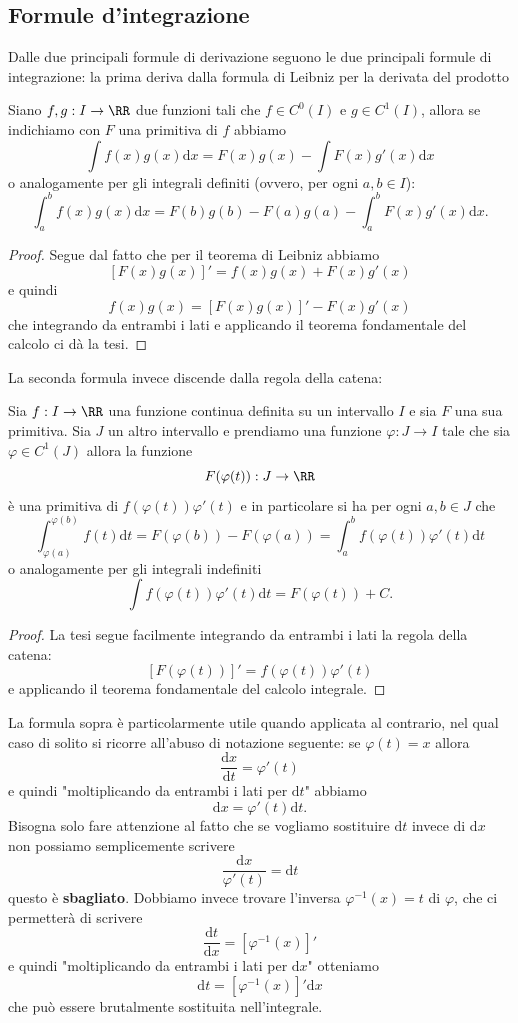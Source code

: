 \documentclass[11pt]{scrartcl}
\newcommand{\dif}{\text{d}}
\begin{document}
	\subsection{Formule d'integrazione}
	Dalle due principali formule di derivazione seguono le due principali formule di integrazione: la prima deriva dalla formula di Leibniz per la derivata del prodotto
	\begin{theorem}
		Siano $f,g:I\to\RR$ due funzioni tali che $f\in C^0(I)$ e $g\in C^1(I)$, allora se indichiamo con $F$ una primitiva di $f$ abbiamo
		$$\int f(x)g(x)\dif x=F(x)g(x)-\int F(x)g'(x)\dif x$$
		o analogamente per gli integrali definiti (ovvero, per ogni $a,b\in I$):
		$$\int_a^b f(x)g(x)\dif x=F(b)g(b)-F(a)g(a)-\int_a^b F(x)g'(x)\dif x.$$
	\end{theorem}
	\begin{proof}
		Segue dal fatto che per il teorema di Leibniz abbiamo
		$$\left[F(x)g(x)\right]'=f(x)g(x)+F(x)g'(x)$$
		e quindi
		$$f(x)g(x)=\left[F(x)g(x)\right]'-F(x)g'(x)$$
		che integrando da entrambi i lati e applicando il teorema fondamentale del calcolo ci dà la tesi.
	\end{proof}
	La seconda formula invece discende dalla regola della catena:
	\begin{theorem}
		Sia $f:I\to\RR$ una funzione continua definita su un intervallo $I$ e sia $F$ una sua primitiva. Sia $J$ un altro intervallo e prendiamo una funzione
		$\varphi:J\to I$ tale che sia $\varphi\in C^1(J)$ allora la funzione 
		$$F(\varphi(t)):J\to \RR$$
		è una primitiva di $f(\varphi(t))\varphi'(t)$ e in particolare si ha per ogni $a,b\in J$ che
		$$\int_{\varphi(a)}^{\varphi(b)}f(t)\dif t=F(\varphi(b))-F(\varphi(a))=\int_a^b f(\varphi(t))\varphi'(t)\dif t$$
		o analogamente per gli integrali indefiniti
		$$\int f(\varphi(t))\varphi'(t)\dif t=F(\varphi(t))+C.$$
	\end{theorem}
	\begin{proof}
		La tesi segue facilmente integrando da entrambi i lati la regola della catena:
		$$\left[F(\varphi(t))\right]'=f(\varphi(t))\varphi'(t)$$
		e applicando il teorema fondamentale del calcolo integrale.
	\end{proof}
	La formula sopra è particolarmente utile quando applicata al contrario, nel qual caso di solito si ricorre all'abuso di notazione seguente: se $\varphi(t)=x$ allora
	$$\frac{\dif x}{\dif t}=\varphi'(t)$$
	e quindi "moltiplicando da entrambi i lati per $\dif t$" abbiamo
	$$\dif x=\varphi'(t)\dif t.$$
	Bisogna solo fare attenzione al fatto che se vogliamo sostituire $\dif t$ invece di $\dif x$ non possiamo semplicemente scrivere
	$$\frac{\dif x}{\varphi'(t)}=\dif t$$
	questo è \textbf{sbagliato}. Dobbiamo invece trovare l'inversa $\varphi^{-1}(x)=t$ di $\varphi$, che ci permetterà di scrivere
	$$\frac{\dif t}{\dif x}=\left[\varphi^{-1}(x)\right]'$$
	e quindi "moltiplicando da entrambi i lati per $\dif x$" otteniamo
	$$\dif t=\left[\varphi^{-1}(x)\right]'\dif x$$
	che può essere brutalmente sostituita nell'integrale.
	
\end{document}
